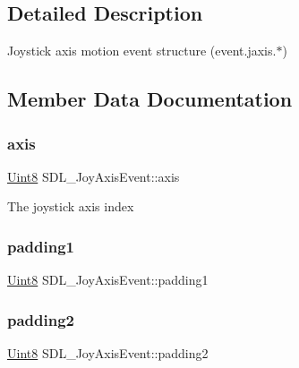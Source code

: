 \subsection{Detailed Description}
Joystick axis motion event structure (event.\+jaxis.$\ast$) 

\subsection{Member Data Documentation}
\mbox{\label{struct_s_d_l___joy_axis_event_a0beac2fb161e45771c424bd0b6daeabb}} 
\subsubsection{\texorpdfstring{axis}{axis}}
{\footnotesize\ttfamily \mbox{\hyperlink{_s_d_l__stdinc_8h_a2944638813a090aa23e62f4da842c3e2}{Uint8}} S\+D\+L\+\_\+\+Joy\+Axis\+Event\+::axis}

The joystick axis index \mbox{\label{struct_s_d_l___joy_axis_event_ae8e17bced478530638982f0382a0dafa}} 
\subsubsection{\texorpdfstring{padding1}{padding1}}
{\footnotesize\ttfamily \mbox{\hyperlink{_s_d_l__stdinc_8h_a2944638813a090aa23e62f4da842c3e2}{Uint8}} S\+D\+L\+\_\+\+Joy\+Axis\+Event\+::padding1}

\mbox{\label{struct_s_d_l___joy_axis_event_ad5407250032f618fde7437ac5f229257}} 
\subsubsection{\texorpdfstring{padding2}{padding2}}
{\footnotesize\ttfamily \mbox{\hyperlink{_s_d_l__stdinc_8h_a2944638813a090aa23e62f4da842c3e2}{Uint8}} S\+D\+L\+\_\+\+Joy\+Axis\+Event\+::padding2}

\mbox{\label{struct_s_d_l___joy_axis_event_a8bf5144fddc19686c2003add1f0e1565}} 
